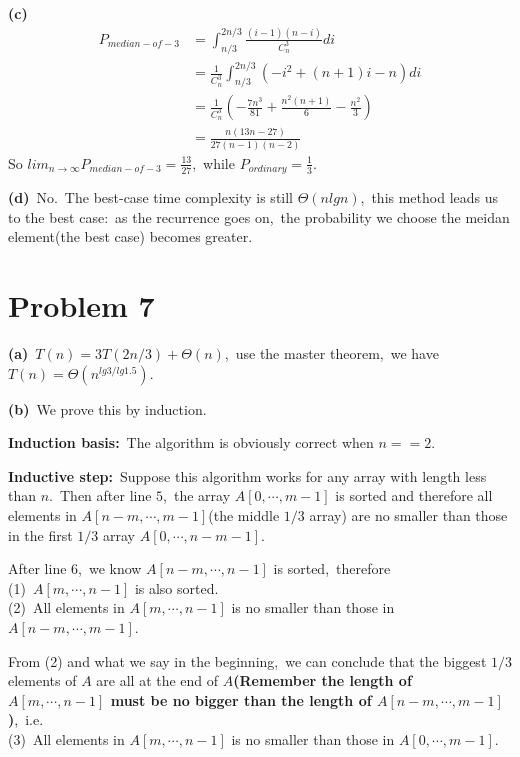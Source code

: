 \documentclass[]{article}
\begin{document}
	\textbf{(c)}
	\begin{equation*}
	\begin{aligned}
	P_{median-of-3} &= \int_{n/3}^{2n/3}\frac{(i-1)(n-i)}{C_n^3}di\\
	&= \frac{1}{C_n^3}\int_{n/3}^{2n/3}(-i^2 + (n+1)i - n)di\\
	&= \frac{1}{C_n^3}(-\frac{7n^3}{81} + \frac{n^2(n+1)}{6} - \frac{n^2}{3})\\
	&= \frac{n(13n - 27)}{27(n - 1)(n -2)}
	\end{aligned}
	\end{equation*}
	So $lim_{n\to \infty}P_{median-of-3} = \frac{13}{27}$,\ while $P_{ordinary} = \frac{1}{3}$.
	
	\textbf{(d)}\ No.\ The best-case time complexity is still $\Theta(nlgn)$,\ this method leads us to the best case:\ as the recurrence goes on,\ the probability we choose the meidan element(the best case) becomes greater.
	
	\section{Problem 7}
	\textbf{(a)}\ $T(n) = 3T(2n/3) + \Theta(n)$,\ use the master theorem,\ we have $T(n) = \Theta(n^{lg3/lg1.5})$.
	
	\textbf{(b)}\ We prove this by induction.
	
	\textbf{Induction basis:}\ The algorithm is obviously correct when $n == 2$.
	
	\textbf{Inductive step:}\ Suppose this algorithm works for any array with length less than $n$.\ Then after line $5$,\ the array $A[0,\cdots,m-1]$ is sorted and therefore all elements in $A[n-m,\cdots,m-1]$(the middle $1/3$ array) are no smaller than those in the first $1/3$ array $A[0,\cdots,n-m-1]$.
	
	After line $6$,\ we know $A[n-m,\cdots,n-1]$ is sorted,\ therefore\\
	(1)\ $A[m,\cdots,n-1]$ is also sorted.\\
	(2)\ All elements in $A[m, \cdots, n-1]$ is no smaller than those in $A[n-m,\cdots,m-1]$.
	
	From (2) and what we say in the beginning,\ we can conclude that the biggest $1/3$ elements of $A$ are all at the end of $A$\textbf{(Remember the length of $A[m,\cdots,n-1]$ must be no bigger than the length of $A[n-m,\cdots,m-1]$)},\ i.e.\\
	(3)\ All elements in $A[m, \cdots, n-1]$ is no smaller than those in $A[0,\cdots,m-1]$.
	
\end{document}
